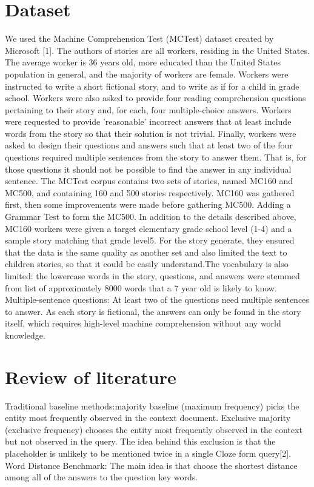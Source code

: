 \documentclass[runningheads,a4paper]{llncs}
\begin{document}
\section{Dataset}
We used the Machine Comprehension Test (MCTest) dataset created by Microsoft [1]. The authors of stories are all workers, residing in the United States. The average worker is 36 years old, more educated than the United States population in general, and the majority of workers are female. Workers were instructed to write a short fictional story, and to write as if for a child in grade school. Workers were also asked to provide four reading comprehension questions pertaining to their story and, for each, four multiple-choice answers. Workers were requested to provide 'reasonable' incorrect answers that at least include words from the story so that their solution is not trivial. Finally, workers were asked to design their questions and answers such that at least two of the four questions required multiple sentences from the story to answer them. That is, for those questions it should not be possible to find the answer in any individual sentence. 
The MCTest corpus contains two sets of stories, named MC160 and MC500, and containing 160 and 500 stories respectively. MC160 was gathered first, then some improvements were made before gathering MC500. Adding a Grammar Test to form the MC500. 
In addition to the details described above, MC160 workers were given a target elementary grade school level (1-4) and a sample story matching that grade level5. 
For the story generate, they ensured that the data is the same quality as another set and also limited the text to children stories, so that it could be easily understand.The  vocabulary is also limited: the lowercase words in the story, questions, and answers were stemmed from list of approximately 8000 words that a 7 year old is likely to know. Multiple-sentence questions: At least two of the questions need multiple sentences to answer. As each story is fictional, the answers can only be found in the story itself, which requires high-level machine comprehension without any world knowledge.


\section{Review of literature}
Traditional baseline methods:majority baseline (maximum frequency) picks the entity most frequently observed in the context document.
Exclusive majority (exclusive frequency) chooses the entity most frequently observed in the context but not observed in the query. The idea behind this exclusion is that the placeholder is unlikely to be mentioned twice in a single Cloze form query[2]. 
Word Distance Benchmark: The main idea is that choose the shortest distance among all of the answers to the question key words.
\end{document}
